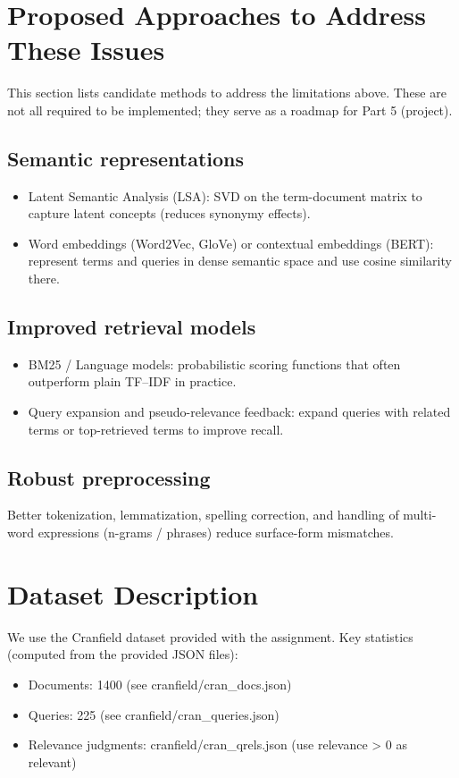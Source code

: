 \documentclass[11pt,a4paper]{article}
\begin{document}
\section{Proposed Approaches to Address These Issues}
This section lists candidate methods to address the limitations above. These are
not all required to be implemented; they serve as a roadmap for Part 5 (project).

\subsection{Semantic representations}
\begin{itemize}[noitemsep]
  \item Latent Semantic Analysis (LSA): SVD on the term-document matrix to capture
    latent concepts (reduces synonymy effects).
  \item Word embeddings (Word2Vec, GloVe) or contextual embeddings (BERT): represent
    terms and queries in dense semantic space and use cosine similarity there.
\end{itemize}

\subsection{Improved retrieval models}
\begin{itemize}[noitemsep]
  \item BM25 / Language models: probabilistic scoring functions that often outperform
    plain TF--IDF in practice.
  \item Query expansion and pseudo-relevance feedback: expand queries with related
    terms or top-retrieved terms to improve recall.
\end{itemize}

\subsection{Robust preprocessing}
Better tokenization, lemmatization, spelling correction, and handling of multi-word
expressions (n-grams / phrases) reduce surface-form mismatches.

\section{Dataset Description}
We use the Cranfield dataset provided with the assignment. Key statistics (computed
from the provided JSON files):
\begin{itemize}[noitemsep]
  \item Documents: 1400 (see cranfield/cran_docs.json)
  \item Queries: 225 (see cranfield/cran_queries.json)
  \item Relevance judgments: cranfield/cran_qrels.json (use relevance > 0 as relevant)
\end{itemize}
\end{document}
